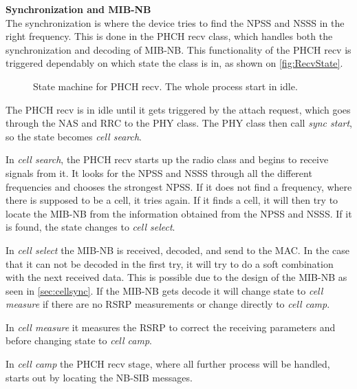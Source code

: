 \textbf{Synchronization and MIB-NB} \\

The synchronization is where the device tries to find the NPSS and NSSS in the right frequency. This is done in the PHCH recv class, which handles both the synchronization and decoding of MIB-NB. This functionality of the PHCH recv is triggered dependably on which state the class is in, as shown on \autoref{fig:RecvState}.

\begin{figure}[H]

\centering


\resizebox{0.5\textwidth}{!}{

}

\caption{State machine for PHCH recv. The whole process start in idle.}

\label{fig:RecvState}

\end{figure}

The PHCH recv is in idle until it gets triggered by the attach request, which goes through the NAS and RRC to the PHY class. The PHY class then call \textit{sync start}, so the state becomes \textit{cell search}.

In \textit{cell search}, the PHCH recv starts up the radio class and begins to receive signals from it. It looks for the NPSS and NSSS through all the different frequencies and chooses the strongest NPSS. If it does not find a frequency, where there is supposed to be a cell, it tries again. If it finds a cell, it will then try to locate the MIB-NB from the information obtained from the NPSS and NSSS. If it is found, the state changes to \textit{cell select}.

In \textit{cell select} the MIB-NB is received, decoded, and send to the MAC. In the case that it can not be decoded in the first try, it will try to do a soft combination with the next received data. This is possible due to the design of the MIB-NB  as seen in \autoref{sec:cellsync}. If the MIB-NB gets decode it will change state to \textit{cell measure} if there are no \gls{RSRP} measurements or change directly to  \textit{cell camp}. 

In \textit{cell measure} it measures the RSRP to correct the receiving parameters and before changing state to \textit{cell camp}.

In \textit{cell camp} the PHCH recv stage, where all further process will be handled, starts out by locating the NB-SIB messages.

